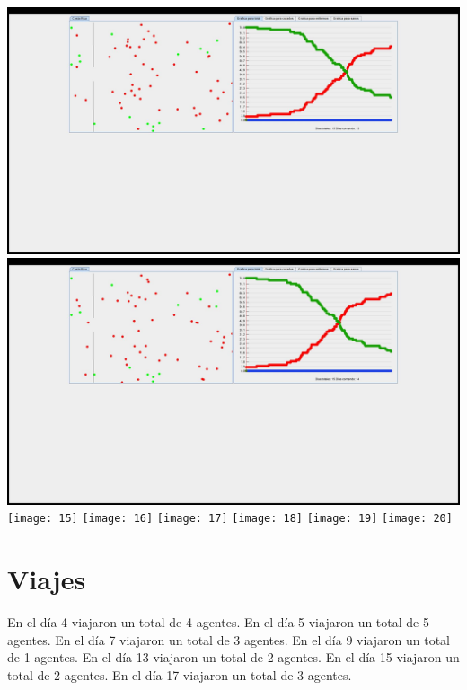 \documentclass{report}
\begin{document}
\includegraphics[scale=0.20]{13}
\includegraphics[scale=0.20]{14}
\texttt{[image: 15]}
\texttt{[image: 16]}
\texttt{[image: 17]}
\texttt{[image: 18]}
\texttt{[image: 19]}
\texttt{[image: 20]}
\newpage
\section{Viajes}
En el d\'ia 4 viajaron un total de 4 agentes.\n
En el d\'ia 5 viajaron un total de 5 agentes.\n
En el d\'ia 7 viajaron un total de 3 agentes.\n
En el d\'ia 9 viajaron un total de 1 agentes.\n
En el d\'ia 13 viajaron un total de 2 agentes.\n
En el d\'ia 15 viajaron un total de 2 agentes.\n
En el d\'ia 17 viajaron un total de 3 agentes.\newline
\end{document}
